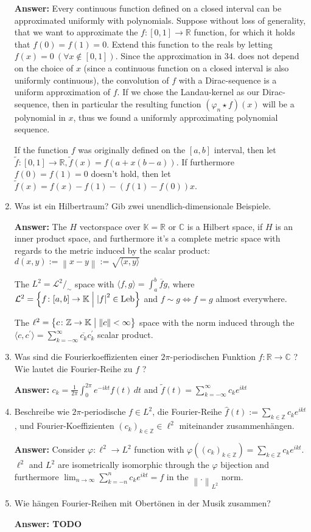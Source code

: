 \documentclass[11pt]{article}
\newcommand{\norm}[1]{\left\lVert#1\right\rVert}
\newcommand{\abs}[1]{\left|#1\right|}
\newcommand{\RR}[0]{\mathbb{R}}
\newcommand{\CC}[0]{\mathbb{C}}
\newcommand{\ZZ}[0]{\mathbb{Z}}
\newcommand{\KK}[0]{\mathbb{K}}
\DeclareMathOperator{\Leb}{Leb}
\begin{document}
\begin{enumerate}
    \textbf{Answer:} Every continuous function defined on a closed interval can be approximated uniformly with polynomials. Suppose without loss of generality, that we want to approximate the $f: [0, 1] \to \RR$ function, for which it holds that $f(0) = f(1) = 0$. Extend this function to the reals by letting $f(x) = 0~(\forall x \notin [0, 1])$. Since the approximation in 34. does not depend on the choice of $x$ (since a continuous function on a closed interval is also uniformly continuous), the convolution of $f$ with a Dirac-sequence is a uniform approximation of $f$. If we chose the Landau-kernel as our Dirac-sequence, then in particular the resulting function $(\varphi_n \star f)(x)$ will be a polynomial in $x$, thus we found a uniformly approximating polynomial sequence.

    If the function $f$ was originally defined on the $[a, b]$ interval, then let $\tilde{f}\colon[0, 1] \to \RR, \tilde{f}(x) = f(a + x(b-a))$. If furthermore $f(0) = f(1) = 0$ doesn't hold, then let $\tilde{f}(x) = f(x) - f(1) - (f(1) - f(0))x.$

    \item Was ist ein Hilbertraum? Gib zwei unendlich-dimensionale Beispiele.

    \textbf{Answer:} The $H$ vectorspace over $\KK=\RR\text{ or }\CC$ is a Hilbert space, if $H$ is an inner product space, and furthermore it's a complete metric space with regards to the metric induced by the scalar product: $d(x, y) := \norm{x - y} := \sqrt{\langle x, y \rangle}$

    The $L^2 = {{\mathcal{L}}^2}/_\sim$ space with $\langle f, g \rangle = \int_a^b \overline{f} g$, where $\mathcal{L}^2 = \left\{f\colon [a, b] \to \KK \Bigm| \abs{f}^2 \in \Leb\right\}$ and $f \sim g \Leftrightarrow f = g$ almost everywhere.

    The $\ell^2 = \left\{c \colon \ZZ \to \KK \bigm| \norm{c} < \infty \right\}$ space with the norm induced through the $\langle c, c^\prime\rangle = \sum_{k=-\infty}^\infty \overline{c_k} c_k^\prime$ scalar product.

    \item Was sind die Fourierkoeffizienten einer $2\pi$-periodischen Funktion $f: \RR \to \CC$ ? Wie lautet die Fourier-Reihe zu $f$ ?

    \textbf{Answer:} $c_k = \frac{1}{2\pi} \int_0^{2\pi} e^{-ikt} f(t) \,dt$ and $\tilde{f}(t) = \sum_{k=-\infty}^\infty c_k e^{ikt}$
    \item Beschreibe wie $2\pi$-periodische $f \in L^2$, die Fourier-Reihe $\hat{f}(t) := \sum_{k\in\ZZ}{c_k e^{ikt}}$, und Fourier-Koeffizienten $(c_k)_{k \in \ZZ} \in \ell^2$ miteinander zusammenhängen.

    \textbf{Answer:} Consider $\varphi: \ell^2 \to L^2$ function with $\varphi\left((c_k)_{k \in \ZZ}\right) = \sum_{k\in\ZZ}{c_k e^{ikt}}$. $\ell^2$ and $L^2$ are isometrically isomorphic through the $\varphi$ bijection and furthermore $\lim_{n\to\infty}\sum_{k=-n}^n {c_k e^{ikt}} = f$ in the $\norm{.}_{L^2}$ norm.
    \item Wie hängen Fourier-Reihen mit Obertönen in der Musik zusammen?

    \textbf{Answer: TODO}

\end{enumerate}
\end{document}

